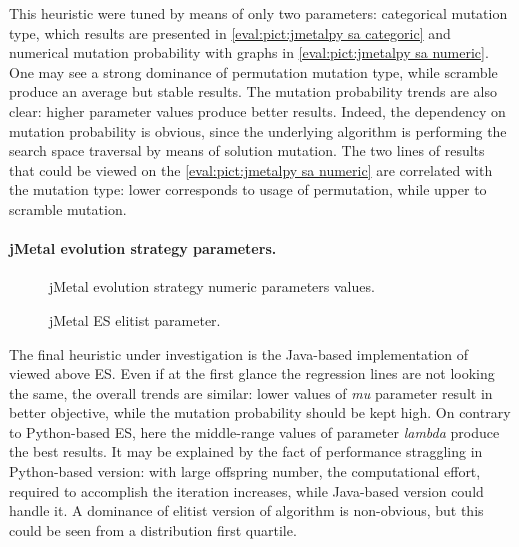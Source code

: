 This heuristic were tuned by means of only two parameters: categorical mutation type, which results are presented in \cref{eval:pict:jmetalpy sa categoric} and numerical mutation probability with graphs in \cref{eval:pict:jmetalpy sa numeric}. One may see a strong dominance of permutation mutation type, while scramble produce an average but stable results. The mutation probability trends are also clear: higher parameter values produce better results. Indeed, the dependency on mutation probability is obvious, since the underlying algorithm is performing the search space traversal by means of solution mutation. The two lines of results that could be viewed on the \cref{eval:pict:jmetalpy sa numeric} are correlated with the mutation type: lower corresponds to usage of permutation, while upper to scramble mutation.


\paragraph{jMetal evolution strategy parameters.}
\begin{figure}[h]
	\centering
	\vspace{-10pt}
	
	\caption{jMetal evolution strategy numeric parameters values.}
	\vspace{-15pt}
	\label{eval:pict:jmetal es numeric}
\end{figure}

\begin{wrapfigure}{R}{0.5\textwidth}
	\centering
	\vspace{-20pt}
	
	\label{eval:pict:jmetal es categoric}
	\caption{jMetal ES elitist parameter.}
	\vspace{-30pt}
\end{wrapfigure}

The final heuristic under investigation is the Java-based implementation of viewed above ES. Even if at the first glance the regression lines are not looking the same, the overall trends are similar: lower values of \emph{mu} parameter result in better objective, while the mutation probability should be kept high. On contrary to Python-based ES, here the middle-range values of parameter \emph{lambda} produce the best results. It may be explained by the fact of performance straggling in Python-based version: with large offspring number, the computational effort, required to accomplish the iteration increases, while Java-based version could handle it. A dominance of elitist version of algorithm is non-obvious, but this could be seen from a distribution first quartile.


